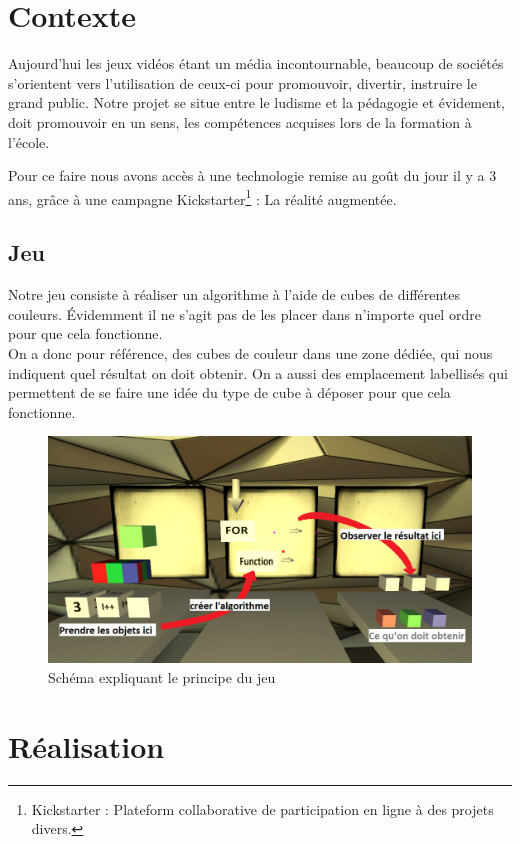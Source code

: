 \documentclass[a4paper,11pt]{myreport}
\begin{document}
\chapter{Contexte}
\par Aujourd'hui les jeux vidéos étant un média incontournable, beaucoup de sociétés s'orientent vers l'utilisation de ceux-ci pour promouvoir, divertir, instruire le grand public. Notre projet se situe entre le ludisme et la pédagogie et évidement, doit promouvoir en un sens, les compétences acquises lors de la formation à l'école.
\par Pour ce faire nous avons accès à une technologie remise au goût du jour il y a 3 ans, grâce à une campagne Kickstarter\footnote{Kickstarter : Plateform collaborative de participation en ligne à des projets divers.} : La réalité augmentée.

\section*{Jeu}
\par Notre jeu consiste à réaliser un algorithme à l'aide de cubes de différentes couleurs. Évidemment il ne s'agit pas de les placer dans n'importe quel ordre pour que cela fonctionne.\\
On a donc pour référence, des cubes de couleur dans une zone dédiée, qui nous indiquent quel résultat on doit obtenir. On a aussi des emplacement labellisés qui permettent de se faire une idée du type de cube à déposer pour que cela fonctionne. 
\begin{figure}[h]
	\includegraphics[scale=0.50]{./images/jeu.png}
	\caption{Schéma expliquant le principe du jeu}
	\end{figure}

\chapter{Réalisation}
\end{document}
